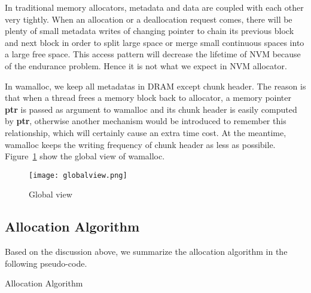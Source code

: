 \documentclass{vldb}
\begin{document}
In traditional memory allocators, metadata and data are coupled with each other very tightly.
When an allocation or a deallocation request comes, there will be plenty of small metadata writes of changing pointer to chain its previous block and next block in order to split large space or merge small continuous spaces into a large free space.
This access pattern will decrease the lifetime of NVM because of the endurance problem.
Hence it is not what we expect in NVM allocator.

In wamalloc, we keep all metadatas in DRAM except chunk header. 
The reason is that when a thread frees a memory block back to allocator, a memory pointer \textbf{ptr} is passed as argument to wamalloc and its chunk header is easily computed by \textbf{ptr},
otherwise another mechanism would be introduced to remember this relationship, which will certainly cause an extra time cost.
At the meantime, wamalloc keeps the writing frequency of chunk header as less as possibile. Figure~\ref{fig:globalview} show the global view of wamalloc.
\begin{figure}[ht!]
\centering
\texttt{[image: globalview.png]}
\caption{Global view}
\label{fig:globalview}
\end{figure}

\subsection{Allocation Algorithm}

Based on the discussion above, we summarize the allocation algorithm in the following pseudo-code.

\begin{algorithm}
\caption{Allocation Algorithm}\label{euclid}
\end{algorithm}
\end{document}
